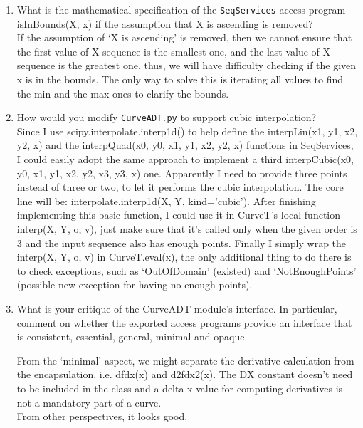 \documentclass[12pt]{article}
\begin{document}
\begin{enumerate}

\item What is the mathematical specification of the \texttt{SeqServices} access
  program isInBounds(X, x) if the assumption that X is ascending is removed?\\
  
  If the assumption of ‘X is ascending’ is removed, then we cannot ensure that the first value of X sequence is the smallest one, and the last value of X sequence is the greatest one, thus, we will have difficulty checking if the given x is in the bounds. The only way to solve this is iterating all values to find the min and the max ones to clarify the bounds.\\

\item How would you modify \texttt{CurveADT.py} to support cubic interpolation?\\

Since I use scipy.interpolate.interp1d() to help define the interpLin(x1, y1, x2, y2, x) and the interpQuad(x0, y0, x1, y1, x2, y2, x) functions in SeqServices, I could easily adopt the same approach to implement a third interpCubic(x0, y0, x1, y1, x2, y2, x3, y3, x) one. Apparently I need to provide three points instead of three or two, to let it performs the cubic interpolation.  The core line will be: interpolate.interp1d(X, Y, kind='cubic').
After finishing implementing this basic function, I could use it in CurveT’s local function interp(X, Y, o, v), just make sure that it's called only when the given order is 3 and the input sequence also has enough points.
Finally I simply wrap the interp(X, Y, o, v) in CurveT.eval(x), the only additional thing to do there is to check exceptions, such as ‘OutOfDomain’ (existed) and ‘NotEnoughPoints’ (possible new exception for having no enough points).\\


\item What is your critique of the CurveADT module's interface.  In particular,
  comment on whether the exported access programs provide an interface that is
  consistent, essential, general, minimal and opaque.
  
  From the ‘minimal’ aspect, we might separate the derivative calculation from the encapsulation, i.e. dfdx(x) and d2fdx2(x). The DX constant doesn't need to be included in the class and a delta x value for computing derivatives is not a mandatory part of a curve.\\
From other perspectives, it looks good.\\



\end{enumerate}
\end{document}

